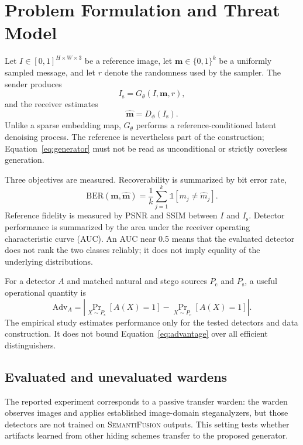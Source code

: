 \documentclass[pdflatex,sn-mathphys-num]{sn-jnl}
\newcommand{\method}{\textsc{SemantiFusion}}
\newcommand{\stego}{I_{\mathrm{s}}}
\newcommand{\msg}{\mathbf{m}}
\newcommand{\mhat}{\widehat{\mathbf{m}}}
\begin{document}
\section{Problem Formulation and Threat Model}
\label{sec:formulation}

Let $I\in[0,1]^{H\times W\times3}$ be a reference image, let $\msg\in\{0,1\}^{k}$ be a uniformly sampled message, and let $r$ denote the randomness used by the sampler. The sender produces
\begin{equation}
\stego = G_{\theta}(I,\msg,r),
\label{eq:generator}
\end{equation}
and the receiver estimates
\begin{equation}
\mhat = D_{\phi}(\stego).
\label{eq:decoder}
\end{equation}
Unlike a sparse embedding map, $G_{\theta}$ performs a reference-conditioned latent denoising process. The reference is nevertheless part of the construction; Equation~\eqref{eq:generator} must not be read as unconditional or strictly coverless generation.

Three objectives are measured. Recoverability is summarized by bit error rate,
\begin{equation}
\mathrm{BER}(\msg,\mhat)=\frac{1}{k}\sum_{j=1}^{k}\mathbb{1}[m_j\neq\widehat{m}_j].
\label{eq:ber}
\end{equation}
Reference fidelity is measured by PSNR and SSIM between $I$ and $\stego$. Detector performance is summarized by the area under the receiver operating characteristic curve (AUC). An AUC near 0.5 means that the evaluated detector does not rank the two classes reliably; it does not imply equality of the underlying distributions.

For a detector $A$ and matched natural and stego sources $P_{\mathrm{c}}$ and $P_{\mathrm{s}}$, a useful operational quantity is
\begin{equation}
\mathrm{Adv}_{A}=\left|\Pr_{X\sim P_{\mathrm{s}}}[A(X)=1]-
\Pr_{X\sim P_{\mathrm{c}}}[A(X)=1]\right|.
\label{eq:advantage}
\end{equation}
The empirical study estimates performance only for the tested detectors and data construction. It does not bound Equation~\eqref{eq:advantage} over all efficient distinguishers.

\subsection{Evaluated and unevaluated wardens}

The reported experiment corresponds to a passive transfer warden: the warden observes images and applies established image-domain steganalyzers, but those detectors are not trained on \method{} outputs. This setting tests whether artifacts learned from other hiding schemes transfer to the proposed generator.
\end{document}
